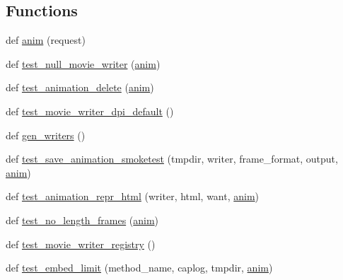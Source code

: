 \subsection*{Functions}
\begin{DoxyCompactItemize}
\item 
def \hyperlink{namespacematplotlib_1_1tests_1_1test__animation_a51b21831a9d76c555ea5ec7148ebe9be}{anim} (request)
\item 
def \hyperlink{namespacematplotlib_1_1tests_1_1test__animation_af5902def94b1b018ad7a478d31414e88}{test\+\_\+null\+\_\+movie\+\_\+writer} (\hyperlink{namespacematplotlib_1_1tests_1_1test__animation_a51b21831a9d76c555ea5ec7148ebe9be}{anim})
\item 
def \hyperlink{namespacematplotlib_1_1tests_1_1test__animation_a083aca1593c496f9a4914fdcf9537bfd}{test\+\_\+animation\+\_\+delete} (\hyperlink{namespacematplotlib_1_1tests_1_1test__animation_a51b21831a9d76c555ea5ec7148ebe9be}{anim})
\item 
def \hyperlink{namespacematplotlib_1_1tests_1_1test__animation_a59134a350d3961514aa86cb3c85e1d13}{test\+\_\+movie\+\_\+writer\+\_\+dpi\+\_\+default} ()
\item 
def \hyperlink{namespacematplotlib_1_1tests_1_1test__animation_ad1c47d8cd388c48b6d3cbb819fa0f625}{gen\+\_\+writers} ()
\item 
def \hyperlink{namespacematplotlib_1_1tests_1_1test__animation_af661e98d0b9a8de16d2c16344cfa920a}{test\+\_\+save\+\_\+animation\+\_\+smoketest} (tmpdir, writer, frame\+\_\+format, output, \hyperlink{namespacematplotlib_1_1tests_1_1test__animation_a51b21831a9d76c555ea5ec7148ebe9be}{anim})
\item 
def \hyperlink{namespacematplotlib_1_1tests_1_1test__animation_af6beeb68c6728792d31b2f45e165a2f8}{test\+\_\+animation\+\_\+repr\+\_\+html} (writer, html, want, \hyperlink{namespacematplotlib_1_1tests_1_1test__animation_a51b21831a9d76c555ea5ec7148ebe9be}{anim})
\item 
def \hyperlink{namespacematplotlib_1_1tests_1_1test__animation_a5cf13fb234bf610c2e9e10b46c926af9}{test\+\_\+no\+\_\+length\+\_\+frames} (\hyperlink{namespacematplotlib_1_1tests_1_1test__animation_a51b21831a9d76c555ea5ec7148ebe9be}{anim})
\item 
def \hyperlink{namespacematplotlib_1_1tests_1_1test__animation_a6273466535303ccf70357e4cc50a4de0}{test\+\_\+movie\+\_\+writer\+\_\+registry} ()
\item 
def \hyperlink{namespacematplotlib_1_1tests_1_1test__animation_ab4748e21d7173c25567e6b45d4c515de}{test\+\_\+embed\+\_\+limit} (method\+\_\+name, caplog, tmpdir, \hyperlink{namespacematplotlib_1_1tests_1_1test__animation_a51b21831a9d76c555ea5ec7148ebe9be}{anim})

\end{DoxyCompactItemize}
